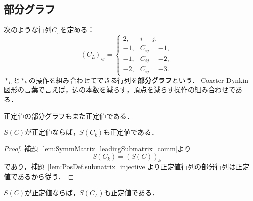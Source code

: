\subsection{部分グラフ}

\begin{definition}
  \label{def:CartanMatrix.LowerLabel}
  \leanok
  次のような行列$C_L$を定める：
  \begin{equation}
    (C_L)_{ij} = \begin{cases}
      2, & i = j, \\
      -1, & C_{ij} = -1, \\
      -1, & C_{ij} = -2, \\
      -2, & C_{ij} = -3.
    \end{cases}
  \end{equation}
  $*_L$と$*_k$の操作を組み合わせてできる行列を\textbf{部分グラフ}という．
  Coxeter-Dynkin図形の言葉で言えば，辺の本数を減らす，頂点を減らす操作の組み合わせである．
\end{definition}

正定値の部分グラフもまた正定値である．

\begin{theorem}
  \label{thm:CartanMatrix.sub_of_pos_def}
  \leanok
  $S(C)$が正定値ならば，$S(C_k)$も正定値である．
\end{theorem}

\begin{proof}
  補題~\ref{lem:SymmMatrix_leadingSubmatrix_comm}より
  \begin{equation}
    S(C_k)
    = (S(C))_k
  \end{equation}
  であり，補題~\ref{lem:PosDef.submatrix_injective}より正定値行列の部分行列は正定値であるから従う．
\end{proof}

\begin{theorem}
  \label{thm:CartanMatrix.sub_of_pos_def'}
  \leanok
  \uses{}
  $S(C)$が正定値ならば，$S(C_L)$も正定値である．
\end{theorem}

